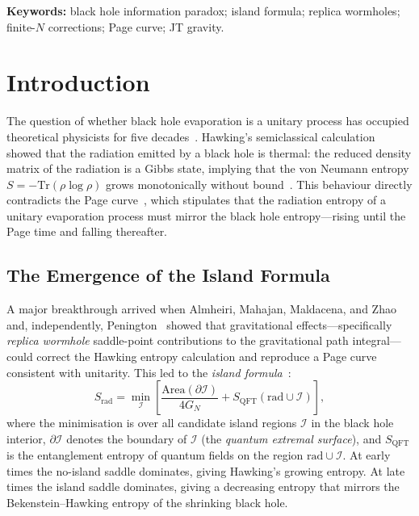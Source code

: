 \documentclass[12pt,a4paper]{article}
\newcommand{\Srad}{S_{\mathrm{rad}}}
\newcommand{\II}{\mathcal{I}}
\newcommand{\Tr}{\mathrm{Tr}}
\begin{document}
\noindent\textbf{Keywords:} black hole information paradox; island formula;
replica wormholes; finite-$N$ corrections; Page curve; JT gravity.

\tableofcontents
\newpage

\section{Introduction}
\label{sec:intro}

The question of whether black hole evaporation is a unitary process has
occupied theoretical physicists for five decades~\citep{Hawking1975}.
Hawking's semiclassical calculation showed that the radiation emitted by a
black hole is thermal: the reduced density matrix of the radiation is a
Gibbs state, implying that the von Neumann entropy $S = -\Tr(\rho\log\rho)$
grows monotonically without bound~\citep{Hawking1975,Hawking1976}.  This
behaviour directly contradicts the Page curve~\citep{Page1993a,Page1993b},
which stipulates that the radiation entropy of a unitary evaporation process
must mirror the black hole entropy—rising until the Page time and falling
thereafter.

\subsection{The Emergence of the Island Formula}
\label{subsec:island_intro}

A major breakthrough arrived when Almheiri, Mahajan, Maldacena, and
Zhao~\citep{Almheiri2019a} and, independently, Penington~\citep{Penington2020}
showed that gravitational effects—specifically \emph{replica wormhole}
saddle-point contributions to the gravitational path integral—could correct
the Hawking entropy calculation and reproduce a Page curve consistent with
unitarity.  This led to the \emph{island formula}~\citep{Almheiri2019b}:
\begin{equation}
  \Srad = \min_{\II}\left[\frac{\mathrm{Area}(\partial\II)}{4G_N}
    + S_{\mathrm{QFT}}(\mathrm{rad}\cup\II)\right],
\label{eq:island_formula}
\end{equation}
where the minimisation is over all candidate island regions $\II$ in the
black hole interior, $\partial\II$ denotes the boundary of $\II$
(the \emph{quantum extremal surface}), and $S_{\mathrm{QFT}}$ is the
entanglement entropy of quantum fields on the region $\mathrm{rad}\cup\II$.
At early times the no-island saddle dominates, giving Hawking's growing
entropy.  At late times the island saddle dominates, giving a decreasing
entropy that mirrors the Bekenstein--Hawking entropy of the shrinking black
hole.
\end{document}
